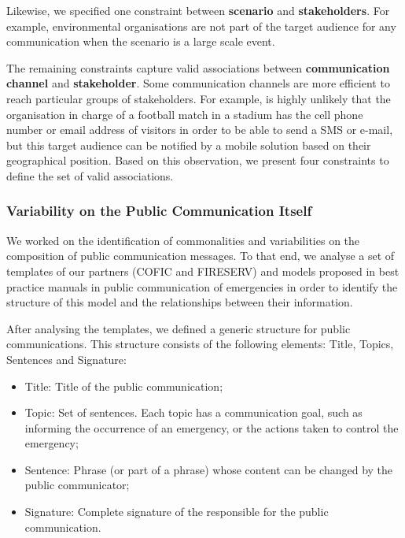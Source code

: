 Likewise, we specified one constraint between \textbf{scenario} and \textbf{stakeholders}. For example, environmental organisations are not part of the target audience for any communication when the scenario is a large scale event.

The remaining constraints capture valid associations between \textbf{communication channel} and \textbf{stakeholder}. Some communication channels are more efficient to reach particular groups of stakeholders. For example, is highly unlikely that the organisation in charge of a football match in a stadium has the cell phone number or email address of visitors in order to be able to send a SMS or e-mail, but this target audience can be notified by a mobile solution based on their geographical position. Based on this observation, we present four constraints to define the set of valid associations.



\subsubsection{Variability on the Public Communication Itself}

We worked on the identification of commonalities and variabilities on the composition of public communication messages. To that end, we analyse a set of templates of our partners (COFIC and FIRESERV) and models proposed in best practice manuals \citep{cisvGuide} \citep{certTemplates} \citep{panamericanhealthorganization2009} in public communication of emergencies in order to identify the structure of this model and the relationships between their information. 

After analysing the templates, we defined a generic structure for public communications. This structure consists of the following elements: Title, Topics, Sentences and Signature:

\begin{itemize}
   \item Title: Title of the public communication;
   \item Topic: Set of sentences. Each topic has a communication goal, such as informing the occurrence of an emergency, or the actions taken to control the emergency;
   \item Sentence: Phrase (or part of a phrase) whose content can be changed by the public communicator;
   \item Signature: Complete signature of the responsible for the public communication.

 \end{itemize}
 
